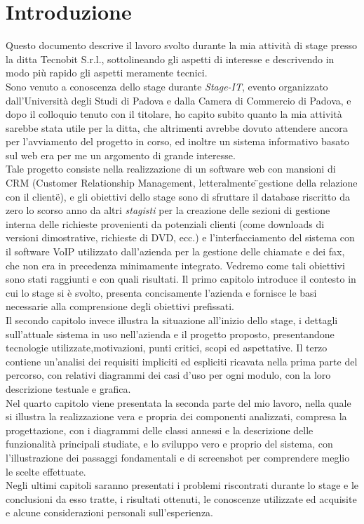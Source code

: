 \section{Introduzione}
Questo documento descrive il lavoro svolto durante la mia attivit\` a di stage presso la ditta Tecnobit S.r.l., sottolineando gli aspetti di interesse e descrivendo in modo pi\`u rapido gli aspetti meramente tecnici. \\
Sono venuto a conoscenza dello stage durante \textit{Stage-IT}, evento organizzato dall'Universit\` a degli Studi di Padova e dalla Camera di Commercio di Padova, e dopo il colloquio tenuto con il titolare, ho capito subito quanto la mia attivit\`a sarebbe stata utile per la ditta, che altrimenti avrebbe dovuto attendere ancora per l'avviamento del progetto in corso, ed inoltre un sistema informativo basato sul web era per me un argomento di grande interesse. \\
Tale progetto consiste nella realizzazione di un software web con mansioni di CRM (Customer Relationship Management, letteralmente \"{}gestione della relazione con il cliente\"{}), e gli obiettivi dello stage sono di sfruttare il database riscritto da zero lo scorso anno da altri \textit{stagisti} per la creazione delle sezioni di gestione interna delle richieste provenienti da potenziali clienti (come downloads di versioni dimostrative, richieste di DVD, ecc.) e l'interfacciamento del sistema con il software VoIP utilizzato dall'azienda per la gestione delle chiamate e dei fax, che non era in precedenza minimamente integrato. Vedremo come tali obiettivi sono stati raggiunti e con quali risultati. 
Il primo capitolo introduce il contesto in cui lo stage si \` e svolto, presenta concisamente l'azienda e fornisce le basi necessarie alla comprensione degli obiettivi prefissati. \\
Il secondo capitolo invece illustra la situazione all'inizio dello stage, i dettagli sull'attuale sistema in uso nell'azienda e il progetto proposto, presentandone tecnologie utilizzate,motivazioni, punti critici, scopi ed aspettative.  
Il terzo contiene un'analisi dei requisiti impliciti ed espliciti ricavata nella prima parte del percorso, con relativi diagrammi dei casi d'uso per ogni modulo, con la loro descrizione testuale e grafica. \\
Nel quarto capitolo viene presentata la seconda parte del mio lavoro, nella quale si illustra la realizzazione vera e propria dei componenti analizzati, compresa la progettazione, con i diagrammi delle classi annessi e la descrizione delle funzionalit\`a principali studiate, e lo sviluppo vero e proprio del sistema, con l'illustrazione dei passaggi fondamentali e di screenshot per comprendere meglio le scelte effettuate. \\
Negli ultimi capitoli saranno presentati i problemi riscontrati durante lo stage e le conclusioni da esso tratte, i risultati ottenuti, le conoscenze utilizzate ed acquisite e alcune considerazioni personali sull'esperienza.

